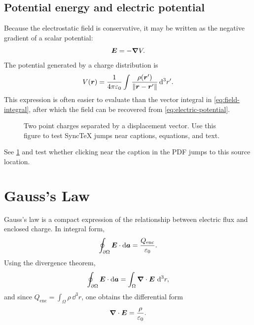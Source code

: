 \subsection{Potential energy and electric potential}

Because the electrostatic field is conservative, it may be written as the negative gradient of a scalar potential:
\begin{equation}
  \bm{E} = -\bm{\nabla} V .
  \label{eq:electric-potential}
\end{equation}
The potential generated by a charge distribution is
\begin{equation}
  V(\bm{r})
  =
  \frac{1}{4\pi\varepsilon_0}
  \int
  \frac{\rho(\bm{r}')}{\lVert \bm{r}-\bm{r}' \rVert}
  \mathop{}\!\mathrm{d}^3r' .
  \label{eq:potential-integral}
\end{equation}
This expression is often easier to evaluate than the vector integral in \cref{eq:field-integral}, after which the field can be recovered from \cref{eq:electric-potential}.

\begin{figure}[h]
\centering
{}
\caption{Two point charges separated by a displacement vector. Use this figure to test SyncTeX jumps near captions, equations, and text.}
\label{fig:two-charges}
\end{figure}

See \cref{fig:two-charges} and test whether clicking near the caption in the PDF jumps to this source location.

\newpage

\section{Gauss's Law}
\label{sec:gauss}

Gauss's law is a compact expression of the relationship between electric flux and enclosed charge.
In integral form,
\begin{equation}
  \oint_{\partial \Omega} \bm{E} \cdot \mathop{}\!\mathrm{d} \bm{a}
  =
  \frac{Q_{\mathrm{enc}}}{\varepsilon_0}.
  \label{eq:gauss-integral}
\end{equation}
Using the divergence theorem,
\begin{equation}
  \oint_{\partial \Omega} \bm{E} \cdot \mathop{}\!\mathrm{d} \bm{a}
  =
  \int_{\Omega} \bm{\nabla} \cdot \bm{E} \, \mathop{}\!\mathrm{d}^3r,
\end{equation}
and since \(Q_{\mathrm{enc}} = \int_{\Omega}\rho \,\dd^3r\), one obtains the differential form
\begin{equation}
  \bm{\nabla} \cdot \bm{E} = \frac{\rho}{\varepsilon_0}.
  \label{eq:gauss-differential}
\end{equation}

